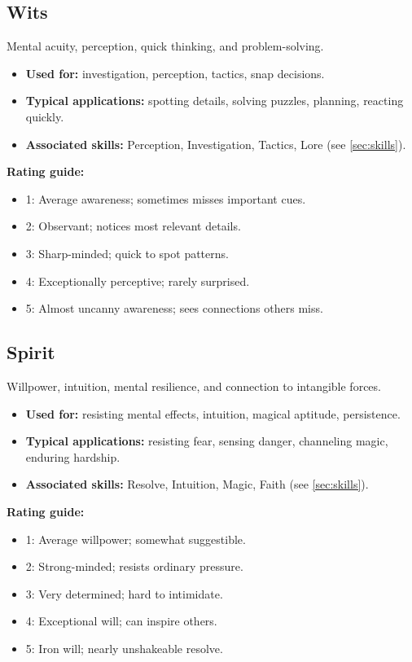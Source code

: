 \subsection{Wits}
\label{sec:attribute-wits}
Mental acuity, perception, quick thinking, and problem-solving.
\begin{itemize}
  \item \textbf{Used for:} investigation, perception, tactics, snap decisions.
  \item \textbf{Typical applications:} spotting details, solving puzzles, planning, reacting quickly.
  \item \textbf{Associated skills:} Perception, Investigation, Tactics, Lore (see \ref{sec:skills}).
\end{itemize}
\textbf{Rating guide:}
\begin{itemize}
  \item 1: Average awareness; sometimes misses important cues.
  \item 2: Observant; notices most relevant details.
  \item 3: Sharp-minded; quick to spot patterns.
  \item 4: Exceptionally perceptive; rarely surprised.
  \item 5: Almost uncanny awareness; sees connections others miss.
\end{itemize}

\subsection{Spirit}
\label{sec:attribute-spirit}
Willpower, intuition, mental resilience, and connection to intangible forces.
\begin{itemize}
  \item \textbf{Used for:} resisting mental effects, intuition, magical aptitude, persistence.
  \item \textbf{Typical applications:} resisting fear, sensing danger, channeling magic, enduring hardship.
  \item \textbf{Associated skills:} Resolve, Intuition, Magic, Faith (see \ref{sec:skills}).
\end{itemize}
\textbf{Rating guide:}
\begin{itemize}
  \item 1: Average willpower; somewhat suggestible.
  \item 2: Strong-minded; resists ordinary pressure.
  \item 3: Very determined; hard to intimidate.
  \item 4: Exceptional will; can inspire others.
  \item 5: Iron will; nearly unshakeable resolve.
\end{itemize}

